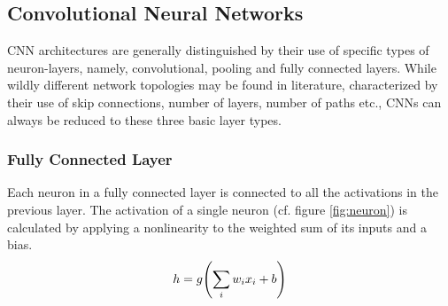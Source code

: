 \subsection{Convolutional Neural Networks}\label{section:cnn}
CNN architectures are generally distinguished by their use of specific types of neuron-layers, namely, convolutional, pooling and fully connected layers. While wildly different network topologies may be found in literature, characterized by their use of skip connections, number of layers, number of paths etc., CNNs can always be reduced to these three basic layer types.
\subsubsection{Fully Connected Layer}
Each neuron in a fully connected layer is connected to all the activations in the previous layer. The activation of a single neuron (cf. figure \ref{fig:neuron}) is calculated by applying a nonlinearity to the weighted sum of its inputs and a bias.
\begin{align}
    h = g\qty(\sum_i w_i x_i +b)
    \label{eq:neuron}
\end{align}
